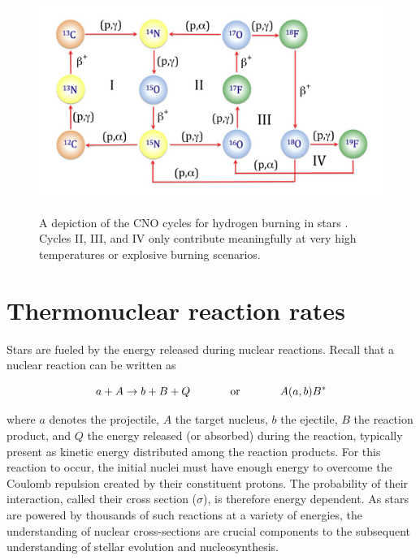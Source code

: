 \begin{figure}
\includegraphics[width=\linewidth]{figures/cnoCycles.png}
\label{fig: CNO-cycles}
\caption{A depiction of the CNO cycles for hydrogen burning in stars \cite{Bertulani2016}. Cycles II, III, and IV only contribute meaningfully at very high temperatures or explosive burning scenarios. }
\end{figure}




\section{Thermonuclear reaction rates}
\label{sec: thermonuclear reaction rates}

Stars are fueled by the energy released during nuclear reactions. Recall that a nuclear reaction can be written as 

\begin{equation}
a + A \rightarrow b + B + Q \hspace{0.5in} \text{or} \hspace{0.5in} A(a,b)B^{*}
\end{equation}

\noindent where $a$ denotes the projectile, $A$ the target nucleus, $b$ the ejectile, $B$ the reaction product, and $Q$ the energy released (or absorbed) during the reaction, typically present as kinetic energy distributed among the reaction products. For this reaction to occur, the initial nuclei must have enough energy to overcome the Coulomb repulsion created by their constituent protons. The probability of their interaction, called their cross section ($\sigma$), is therefore energy dependent. As stars are powered by thousands of such reactions at a variety of energies, the understanding of nuclear cross-sections are crucial components to the subsequent understanding of stellar evolution and nucleosynthesis. 

